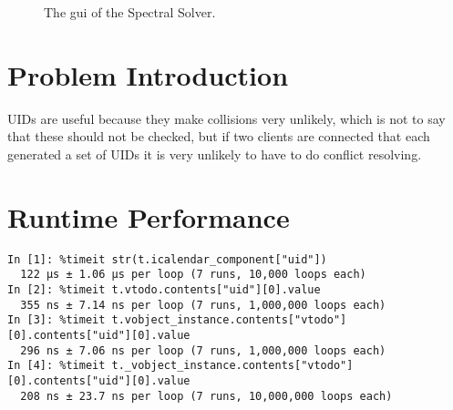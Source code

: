 \documentclass{prettytex/ox/mmsc-special-topic}
\title{\topictitle}
\author{Candidate \candidatenumber}
\date{\today}
\begin{document}
  \pagestyle{plain}
  \mmscSpecialHeader

  \begin{abstract}
    \label{abstract}
    In this project report we will review the central concepts utilised in the group work conducted to make progress in the \gls{pde} problem associated with the electrochemical model of a battery cell and present numerical results.
    \vspace*{0.2cm}

    \noindent
    \textbf{Our Goal:}
    Numerically obtain the solution $\{a(x, T), b(x, T)\}$.

    The Finite Difference schemes are implemented in Julia and Python, whereas the Spectral Method is implemented in C++.
  \end{abstract}

  \begin{figure}[H]
    \centering
    \caption{The \gls{gui} of the Spectral Solver.}
    \label{fig:gui}
  \end{figure}

  \pagebreak
  \pagestyle{normal}

  \section{Problem Introduction}
  \label{sec:introduction}

  UIDs are useful because they make collisions very unlikely, which is not to say that these should not be checked, but if two clients are connected that each generated a set of UIDs it is very unlikely to have to do conflict resolving.

  \section{Runtime Performance}
  \begin{verbatim}
In [1]: %timeit str(t.icalendar_component["uid"])
  122 µs ± 1.06 µs per loop (7 runs, 10,000 loops each)
In [2]: %timeit t.vtodo.contents["uid"][0].value
  355 ns ± 7.14 ns per loop (7 runs, 1,000,000 loops each)
In [3]: %timeit t.vobject_instance.contents["vtodo"][0].contents["uid"][0].value
  296 ns ± 7.06 ns per loop (7 runs, 1,000,000 loops each)
In [4]: %timeit t._vobject_instance.contents["vtodo"][0].contents["uid"][0].value
  208 ns ± 23.7 ns per loop (7 runs, 10,000,000 loops each)
  \end{verbatim}
\end{document}
